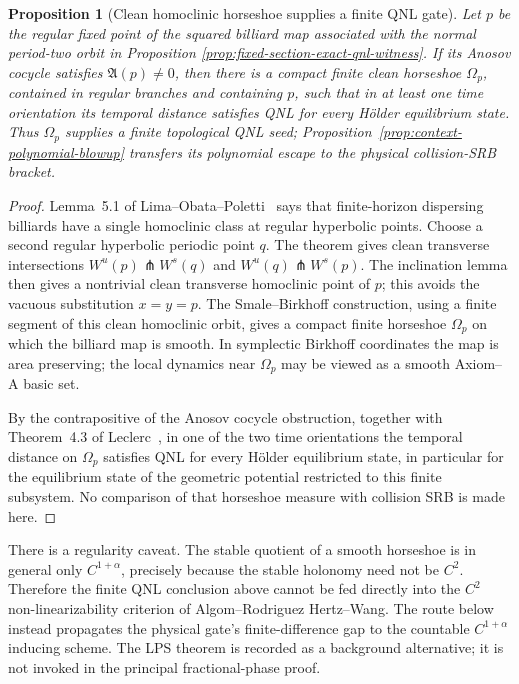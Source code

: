 \documentclass[11pt]{article}
\newtheorem{proposition}[theorem]{Proposition}
\begin{document}
\begin{proposition}[Clean homoclinic horseshoe supplies a finite QNL gate]
\label{prop:homoclinic-horseshoe-uni}
Let $p$ be the regular fixed point of the squared billiard map associated with
the normal period-two orbit in Proposition
\ref{prop:fixed-section-exact-qnl-witness}.  If its Anosov cocycle satisfies
$\mathfrak A(p)\ne0$, then there is a compact finite clean horseshoe
$\Omega_p$, contained in regular branches and containing $p$, such that in at
least one time orientation its temporal distance satisfies QNL for every
H\"older equilibrium state.  Thus $\Omega_p$ supplies a finite topological
      QNL seed; Proposition~\ref{prop:context-polynomial-blowup} transfers its
      polynomial escape to the physical collision-SRB bracket.
\end{proposition}

\begin{proof}
Lemma~5.1 of Lima--Obata--Poletti~\cite{LOP} says that finite-horizon
dispersing billiards have a single homoclinic class at regular hyperbolic
points.  Choose a second regular hyperbolic periodic point $q$.  The theorem
gives clean transverse intersections
$W^u(p)\pitchfork W^s(q)$ and $W^u(q)\pitchfork W^s(p)$.  The inclination
lemma then gives a nontrivial clean transverse homoclinic point of $p$; this
avoids the vacuous substitution $x=y=p$.  The Smale--Birkhoff construction, using
a finite segment of this clean homoclinic orbit, gives a compact finite
horseshoe $\Omega_p$ on which the billiard map is smooth.  In symplectic
Birkhoff coordinates the map is area preserving; the local dynamics near
$\Omega_p$ may be viewed as a smooth Axiom--A basic set.

By the contrapositive of the Anosov cocycle obstruction, together with
Theorem~4.3 of Leclerc~\cite{Leclerc2026}, in one of the two time orientations
the temporal distance on $\Omega_p$ satisfies QNL for every H\"older
equilibrium state, in particular for the equilibrium state of the geometric
potential restricted to this finite subsystem.  No comparison of that
horseshoe measure with collision SRB is made here.
\end{proof}

There is a regularity caveat.  The stable quotient of a smooth horseshoe is in
general only $C^{1+\alpha}$, precisely because the stable holonomy need not be
$C^2$.  Therefore the finite QNL conclusion above cannot be fed directly
into the $C^2$ non-linearizability criterion of
Algom--Rodriguez Hertz--Wang.  The route below instead propagates the
physical gate's finite-difference gap to the countable
$C^{1+\alpha}$ inducing scheme.  The LPS theorem is recorded as a background
alternative; it is not invoked in the principal fractional-phase proof.
\end{document}
